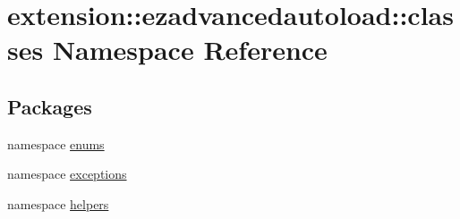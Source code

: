 \hypertarget{namespaceextension_1_1ezadvancedautoload_1_1classes}{\section{extension\-:\-:ezadvancedautoload\-:\-:classes \-Namespace \-Reference}
\label{namespaceextension_1_1ezadvancedautoload_1_1classes}
}
\subsection*{\-Packages}
\begin{DoxyCompactItemize}
\item 
namespace \hyperlink{namespaceextension_1_1ezadvancedautoload_1_1classes_1_1enums}{enums}
\item 
namespace \hyperlink{namespaceextension_1_1ezadvancedautoload_1_1classes_1_1exceptions}{exceptions}
\item 
namespace \hyperlink{namespaceextension_1_1ezadvancedautoload_1_1classes_1_1helpers}{helpers}
\end{DoxyCompactItemize}

